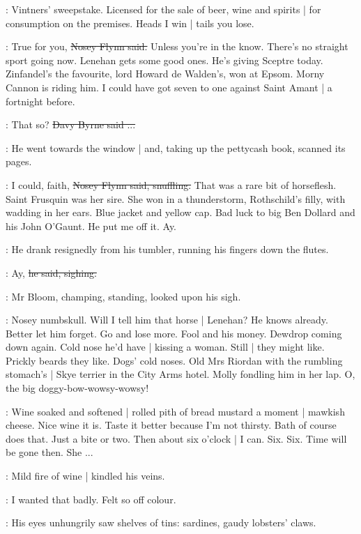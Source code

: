 \BloomInt:
Vintners' sweepstake.
Licensed for the sale of beer, wine and spirits |
for consumption on the premises.
Heads I win |
tails you lose.

\nosey:
True for you,
\sout{Nosey Flynn said.}
Unless you're in the know.
There's no straight sport going now.
Lenehan gets some good ones.
He's giving Sceptre today.
Zinfandel's the favourite,
lord Howard de Walden's,
won at Epsom.
Morny Cannon is riding him.
I could have got seven to one against Saint Amant |
a fortnight before.

\davybyrne:
That so?
\sout{Davy Byrne said ...}

:
He went towards the window |
and, taking up the pettycash book,
scanned its pages.

\nosey:
I could, faith,
\sout{Nosey Flynn said, snuffling.}
That was a rare bit of horseflesh.
Saint Frusquin was her sire.
She won in a thunderstorm,
Rothschild's filly,
with wadding in her ears.
Blue jacket and yellow cap.
Bad luck to big Ben Dollard and his John O'Gaunt.
He put me off it.
Ay.

:
He drank resignedly from his tumbler,
running his fingers down the flutes.

\nosey:
Ay,
\sout{he said, sighing.}

:
Mr Bloom,
champing, standing,
looked upon his sigh.

\BloomInt:
Nosey numbskull.
Will I tell him that horse |
Lenehan?
He knows already.
Better let him forget.
Go and lose more.
Fool and his money.
Dewdrop coming down again.
Cold nose he'd have |
kissing a woman.
Still |
they might like.
Prickly beards they like.
Dogs' cold noses.
Old Mrs Riordan with the rumbling stomach's |
Skye terrier in the City Arms hotel.
Molly fondling him in her lap.
O, the big doggy-bow-wowsy-wowsy!

\BloomInt:
Wine soaked and softened |
rolled pith of bread
mustard a moment |
mawkish cheese.
Nice wine it is.
Taste it better because I'm not thirsty.
Bath of course does that.
Just a bite or two.
Then about six o'clock |
I can.
Six.
Six.
Time will be gone then.
She ...

:
Mild fire of wine |
kindled his veins.

\BloomInt:
I wanted that badly.
Felt so off colour.

:
His eyes unhungrily saw shelves of tins:
sardines, gaudy lobsters' claws.

